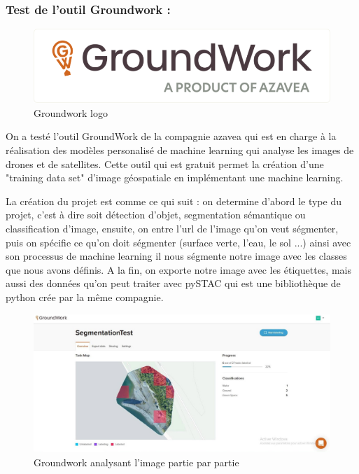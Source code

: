 \documentclass[12pt, openany]{report}
\begin{document}
\newpage
\subsubsection{Test de l'outil Groundwork :}
\begin{figure}[h]
\centering
\includegraphics[scale=0.4]{Groundwork.png}
\caption{Groundwork logo}
\end{figure}

On a testé l'outil GroundWork de la compagnie azavea qui est en charge à la réalisation des modèles personalisé de machine learning qui analyse les images de drones et de satellites.
Cette outil qui est gratuit permet la création d'une "training data set" d'image géospatiale en implémentant une machine learning.
\par
La création du projet est comme ce qui suit : on determine d'abord le type du projet, c'est à dire soit détection d'objet, segmentation sémantique ou classification d'image, ensuite, on entre l'url de l'image qu'on veut ségmenter, puis on spécifie ce qu'on doit ségmenter (surface verte, l'eau, le sol ...) ainsi avec son processus de machine learning il nous ségmente notre image avec les classes que nous avons définis.
A la fin, on exporte notre image avec les étiquettes, mais aussi des données qu'on peut traiter avec pySTAC qui est une bibliothèque de python crée par la même compagnie.

\begin{figure}[h]
\centering
\includegraphics[scale=0.4]{groundwork_screen1.jpg}
\caption{Groundwork analysant l'image partie par partie}
\end{figure}
\end{document}
